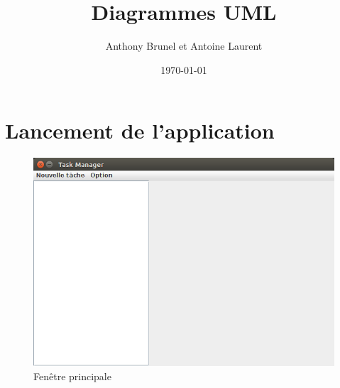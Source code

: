 \documentclass{article}
\title{Diagrammes UML}
\author{Anthony Brunel et Antoine Laurent}
\date{\today}
\begin{document}
\maketitle
\newpage
\tableofcontents
\listoffigures
\newpage

\section{Lancement de l'application}

\begin{figure}[h]
	\centering
	\includegraphics[scale=0.34]{images/MainDIsplay.png}
	\caption{Fenêtre principale}
	\label{Fenêtre principale}
\end{figure}
\end{document}
